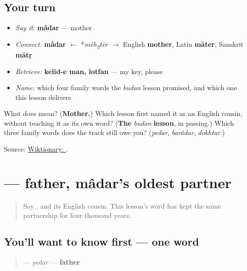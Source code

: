 \subsection*{Your turn}
\begin{itemize}
\raggedright
  \item \emph{Say it:} \textbf{mâdar} — mother
  \item \emph{Connect:} \textbf{mâdar} $\leftarrow$ *\emph{méh\textsubscript{2}tēr} $\to$ English \textbf{mother}, Latin \textbf{māter}, Sanskrit \textbf{mātṛ}
  \item \emph{Retrieve:} \textbf{kelid-e man, lotfan} — my key, please
  \item \emph{Name:} which four family words the \emph{budan} lesson promised, and which one this lesson delivers
\end{itemize}

\begin{tcolorbox}[breakable,colback=teal!4,colframe=teal!35!black,title={Before you move on}]
What does \textbf{} mean? (\textbf{Mother.}) Which lesson first named it as an English cousin, without teaching it as its own word? (\textbf{The} \emph{budan} \textbf{lesson}, in passing.) Which three family words does the track still owe you? (\emph{pedar}, \emph{barâdar}, \emph{dokhtar}.)

Source: \href{https://en.wiktionary.org/wiki/\%D9\%85\%D8\%A7\%D8\%AF\%D8\%B1}{Wiktionary: }.
\end{tcolorbox}
\section[\texorpdfstring{\fa{پدر} (pedar)}{پدر (pedar)}]{ — father, mâdar's oldest partner}

\label{lesson:FA-C10-pedar}



\begin{quote}
Say \textbf{}, and its English cousin. This lesson's word has kept the same partnership for four thousand years.
\end{quote}

\subsection*{You'll want to know first — one word}
\begin{quote}
\textbf{} — \emph{pedar} — \textbf{father}
\end{quote}

